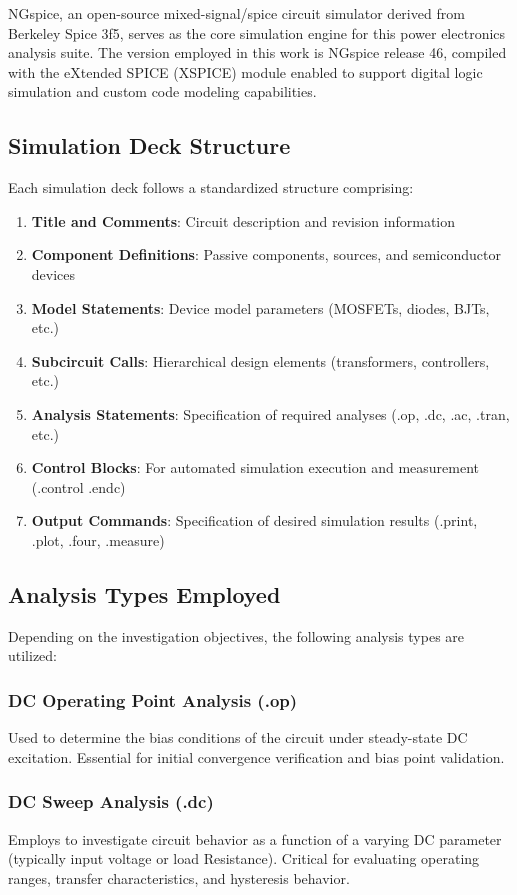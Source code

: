 NGspice, an open-source mixed-signal/spice circuit simulator derived from Berkeley Spice 3f5, serves as the core simulation engine for this power electronics analysis suite. The version employed in this work is NGspice release 46, compiled with the eXtended SPICE (XSPICE) module enabled to support digital logic simulation and custom code modeling capabilities.

\subsection{Simulation Deck Structure}
Each simulation deck follows a standardized structure comprising:
\begin{enumerate}
    \item \textbf{Title and Comments}: Circuit description and revision information
    \item \textbf{Component Definitions}: Passive components, sources, and semiconductor devices
    \item \textbf{Model Statements}: Device model parameters (MOSFETs, diodes, BJTs, etc.)
    \item \textbf{Subcircuit Calls}: Hierarchical design elements (transformers, controllers, etc.)
    \item \textbf{Analysis Statements}: Specification of required analyses (.op, .dc, .ac, .tran, etc.)
    \item \textbf{Control Blocks}: For automated simulation execution and measurement (.control .endc)
    \item \textbf{Output Commands}: Specification of desired simulation results (.print, .plot, .four, .measure)
\end{enumerate}

\subsection{Analysis Types Employed}
Depending on the investigation objectives, the following analysis types are utilized:

\subsubsection{DC Operating Point Analysis (.op)}
Used to determine the bias conditions of the circuit under steady-state DC excitation. Essential for initial convergence verification and bias point validation.

\subsubsection{DC Sweep Analysis (.dc)}
Employs to investigate circuit behavior as a function of a varying DC parameter (typically input voltage or load Resistance). Critical for evaluating operating ranges, transfer characteristics, and hysteresis behavior.


